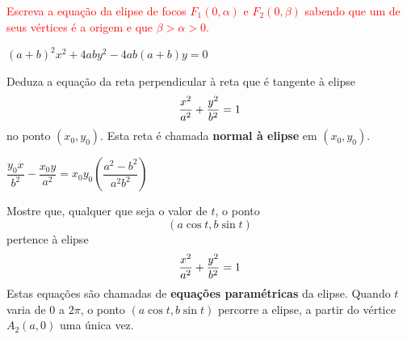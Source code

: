 \documentclass[12pt]{exam}
\begin{document}
\begin{exercicio}
    \textcolor{red}{Escreva a equação da elipse de focos $F_1(0, \alpha)$ e $F_2(0, \beta)$ sabendo que um de seus vértices é a origem e que $\beta > \alpha > 0$.}
    \begin{solucao}
        $(a + b)^2x^2 + 4aby^2 - 4ab(a + b)y = 0$
    \end{solucao}
\end{exercicio}


\begin{exercicio}
    Deduza a equação da reta perpendicular à reta que é tangente à elipse
    \[
        \dfrac{x^2}{a^2} + \dfrac{y^2}{b^2} = 1
    \]
    no ponto $(x_0,y_0)$. Esta reta é chamada \textbf{normal à elipse} em $(x_0,y_0)$.
    \begin{solucao}
        $\dfrac{y_0x}{b^2} - \dfrac{x_0y}{a^2} = x_0y_0\left(\dfrac{a^2 - b^2}{a^2b^2}\right)$
    \end{solucao}
\end{exercicio}

\begin{exercicio}
    Mostre que, qualquer que seja o valor de $t$, o ponto
    \[
        (a\cos t, b\sin t)
    \]
    pertence à elipse
    \[
        \dfrac{x^2}{a^2} + \dfrac{y^2}{b^2} = 1
    \]
    Estas equações são chamadas de \textbf{equações paramétricas} da elipse. Quando $t$ varia de 0 a $2\pi$, o ponto $(a\cos t, b\sin t)$ percorre a elipse, a partir do vértice $A_2(a,0)$ uma \'unica vez.
\end{exercicio}
\end{document}
